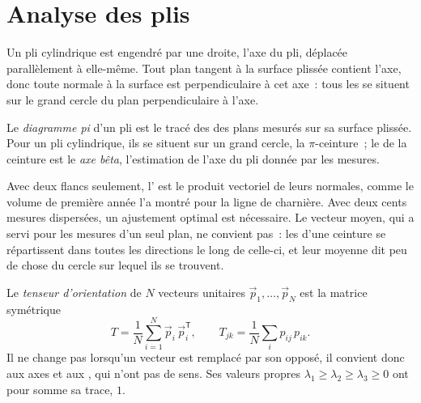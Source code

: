 \section{Analyse des plis}\label{sec:b3:structural-analysis:folds}

Un pli cylindrique est engendré par une droite, l'axe du pli, déplacée
parallèlement à elle-même. Tout plan tangent à la surface plissée contient
l'axe, donc toute normale à la surface est perpendiculaire à cet axe~: tous les
 se situent sur le grand cercle du plan perpendiculaire à l'axe.

\begin{definition}\label{def:b3:structural-analysis:pi}
Le \emph{diagramme pi} d'un pli est le tracé des  des
plans mesurés sur sa surface plissée. Pour un pli cylindrique, ils se situent sur
un grand cercle, la $\pi$-ceinture~; le  de la ceinture est le
\emph{axe bêta}, l'estimation de l'axe du pli donnée par les
mesures.
\end{definition}

Avec deux flancs seulement, l' est le produit vectoriel de leurs normales, comme
le volume de première année l'a montré pour la ligne de charnière. Avec deux cents
mesures dispersées, un ajustement optimal est nécessaire. Le vecteur moyen, qui a servi pour les
mesures d'un seul plan, ne convient pas~: les  d'une ceinture se répartissent dans toutes les directions le long de celle-ci, et
leur moyenne dit peu de chose du cercle sur lequel ils se trouvent.

\begin{definition}\label{def:b3:structural-analysis:orientation-tensor}
Le \emph{tenseur d'orientation} de $N$ vecteurs unitaires
$\vec p_1, \dots, \vec p_N$ est la matrice symétrique
\[
  T = \frac1N\sum_{i=1}^N \vec p_i\,\vec p_i^{\mathsf T},
  \qquad T_{jk} = \frac1N\sum_i p_{ij}\,p_{ik} .
\]
Il ne change pas lorsqu'un vecteur est remplacé par son opposé, il convient donc
aux axes et aux , qui n'ont pas de sens. Ses valeurs propres $\lambda_1 \ge \lambda_2
\ge \lambda_3 \ge 0$ ont pour somme sa trace, $1$.
\end{definition}

